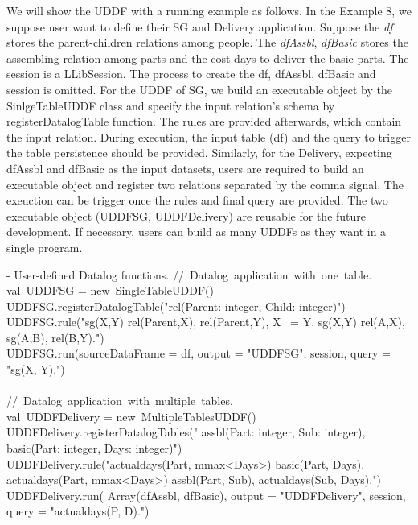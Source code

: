 We will show the UDDF with a running example as follows. In the Example 8, we suppose user want to define their SG and Delivery application.   Suppose the \textit{df} stores the  parent-children relations among people. The \textit{dfAssbl}, \textit{dfBasic} stores the assembling relation among parts and the cost days to deliver the basic parts.  The session is a LLibSession. The process to create the df, dfAssbl, dfBasic and session is omitted. For the UDDF of SG, we build an executable object by the SinlgeTableUDDF class and specify the input relation's schema by registerDatalogTable function. The rules are  provided afterwards, which contain the input relation. During execution, the input table (df) and the  query to trigger the  table persistence should be provided. Similarly, for the Delivery, expecting dfAssbl and dfBasic as the input datasets, users are required to build an executable object and register two relations separated by the comma signal. The exeuction can be trigger once the rules and final query are provided. The two executable object (UDDFSG, UDDFDelivery)  are reusable for the future development. If necessary,  users can  build as many UDDFs as they want in a single program.


\vspace{0.5em}
 - User-defined Datalog functions.
\bldl
//\ Datalog\ application\ with\ one\ table. \\
val\ UDDFSG = new\ SingleTableUDDF() \\
UDDFSG.registerDatalogTable("rel(Parent: integer, Child: integer)") \\
UDDFSG.rule("sg(X,Y) \leftarrow rel(Parent,X), rel(Parent,Y), X ~= Y. sg(X,Y) \leftarrow rel(A,X),\\ sg(A,B), rel(B,Y).") \\
UDDFSG.run(sourceDataFrame = df, output = "UDDFSG", session, query = "sg(X, Y).") \\
\\

//\ Datalog\ application\ with\ multiple\ tables. \\
val\ UDDFDelivery = new\ MultipleTablesUDDF() \\
UDDFDelivery.registerDatalogTables("  assbl(Part: integer, Sub: integer),\\ basic(Part: integer, Days: integer)")\\
UDDFDelivery.rule("actualdays(Part, mmax<Days>) \leftarrow basic(Part, Days).\\ actualdays(Part, mmax<Days>) \leftarrow assbl(Part, Sub), actualdays(Sub, Days).")\\
UDDFDelivery.run( Array(dfAssbl, dfBasic), output = "UDDFDelivery", session,  \\query = "actualdays(P, D).")




